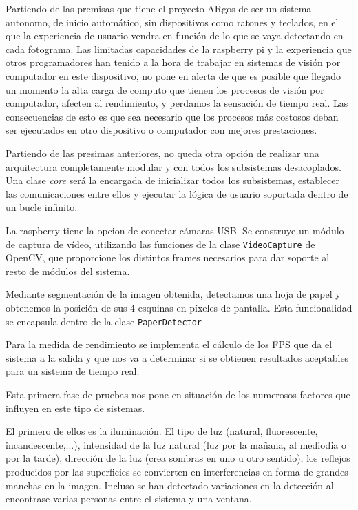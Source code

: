 Partiendo de las premisas que tiene el proyecto ARgos de ser un sistema autonomo, de inicio automático, sin dispositivos como ratones y teclados, en el que la experiencia de usuario vendra en función de lo que se vaya detectando en cada fotograma. Las limitadas capacidades de la raspberry pi y la experiencia que otros programadores han tenido a la hora de trabajar en sistemas de visión por computador en este dispositivo, no pone en alerta de que es posible que llegado un momento la alta carga de computo que tienen los procesos de visión por computador, afecten al rendimiento, y perdamos la sensación de tiempo real. Las consecuencias de esto es que sea necesario que los procesos más costosos deban ser ejecutados en otro dispositivo o computador con mejores prestaciones.  

Partiendo de las presimas anteriores, no queda otra opción de realizar una arquitectura completamente modular y con todos los subsistemas desacoplados. Una clase \emph{core} será la encargada de inicializar todos los subsistemas, establecer las comunicaciones entre ellos y ejecutar la lógica de usuario soportada dentro de un bucle infinito.

La raspberry tiene la opcion de conectar cámaras USB. Se construye un módulo de captura de vídeo, utilizando las funciones de la clase \texttt{VideoCapture} de OpenCV, que proporcione los distintos frames necesarios para dar soporte al resto de módulos del sistema. 

Mediante segmentación de la imagen obtenida, detectamos una hoja de papel y obtenemos la posición de sus 4 esquinas en píxeles de pantalla. Esta funcionalidad se encapsula dentro de la clase \texttt{PaperDetector}

Para la medida de rendimiento se implementa el cálculo de los FPS que da el sistema a la salida y que nos va a determinar si se obtienen resultados aceptables para un sistema de tiempo real.

Esta primera fase de pruebas nos pone en situación de los numerosos factores que influyen en este tipo de sistemas.

El primero de ellos es la iluminación. El tipo de luz (natural, fluorescente, incandescente,...), intensidad de la luz natural (luz por la mañana, al mediodia o por la tarde), dirección de la luz (crea sombras en uno u otro sentido), los reflejos producidos por las superficies se convierten en interferencias en forma de grandes manchas en la imagen. Incluso se han detectado variaciones en la detección al encontrase varias personas entre el sistema y una ventana.


